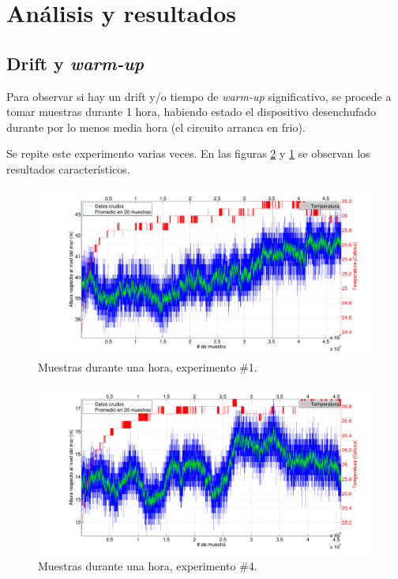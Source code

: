 \documentclass[spanish,12pt,a4paper,titlepage]{report}
\begin{document}
\newpage
\section{Análisis y resultados}

\subsection{Drift y \textit{warm-up}}
\label{sec:drift-y-warm-up}

Para observar si hay un drift y/o tiempo de \textit{warm-up} significativo, se procede a tomar muestras durante 1 hora, habiendo estado el dispositivo desenchufado durante por lo menos media hora (el circuito arranca en frio).

Se repite este experimento varias veces. En las figuras \ref{fig:1hora_04.pdf} y \ref{fig:1hora_01.pdf} se observan los resultados característicos.

\begin{figure}[h!]
  \includegraphics[width=.9\textwidth]{./pics/1hora_01.pdf}
  \caption{Muestras durante una hora, experimento \#1.}
  \label{fig:1hora_01.pdf}
\end{figure}
\vspace{-20pt}
\begin{figure}[h!]
  \includegraphics[width=.9\textwidth]{./pics/1hora_04.pdf}
  \caption{Muestras durante una hora, experimento \#4.}
  \label{fig:1hora_04.pdf}
\end{figure}
\end{document}
